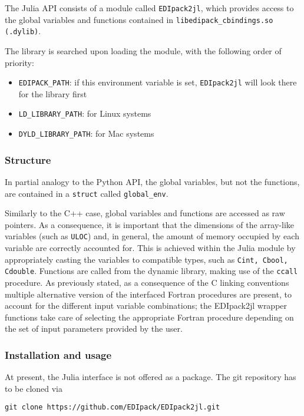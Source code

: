 \documentclass[edipack_sp.tex]{subfiles}
\begin{document}
The \NAME{} Julia API consists of a module called {\tt EDIpack2jl}, which provides access to the global variables and functions contained in {\tt  libedipack\_cbindings.so (.dylib)}. 

The library is searched upon loading the module, with the following order of priority:

\begin{itemize}
\item {\tt EDIPACK\_PATH}: if this environment variable is set, {\tt EDIpack2jl} will look there for the library first
\item {\tt LD\_LIBRARY\_PATH}: for Linux systems
\item {\tt DYLD\_LIBRARY\_PATH}: for Mac systems
\end{itemize}

\subsubsection{Structure}

In partial analogy to the Python API, the global variables, but not the functions, are contained in a  {\tt struct} called {\tt global\_env}.

Similarly to the C++ case, global variables and functions are accessed as raw pointers. As a consequence, it is important that the dimensions of the array-like variables (such as {\tt ULOC}) and, in general, the amount of memory occupied by each variable are correctly accounted for. This is achieved within the Julia module by appropriately casting the variables to compatible types, such as {\tt  Cint, Cbool, Cdouble}.
Functions are called from the dynamic library, making use of the {\tt  ccall} procedure. As previously stated, as a consequence of the C linking conventions multiple alternative version of the interfaced Fortran procedures are present, to account for the different input variable combinations; the EDIpack2jl wrapper functions take care of selecting the appropriate Fortran procedure depending on the set of input parameters provided by the user.

\subsubsection{Installation and usage}

At present, the \NAME Julia interface is not offered as a package. The git repository has to be cloned via

\begin{lstlisting}[style=mybash]
git clone https://github.com/EDIpack/EDIpack2jl.git
\end{lstlisting}
\end{document}
